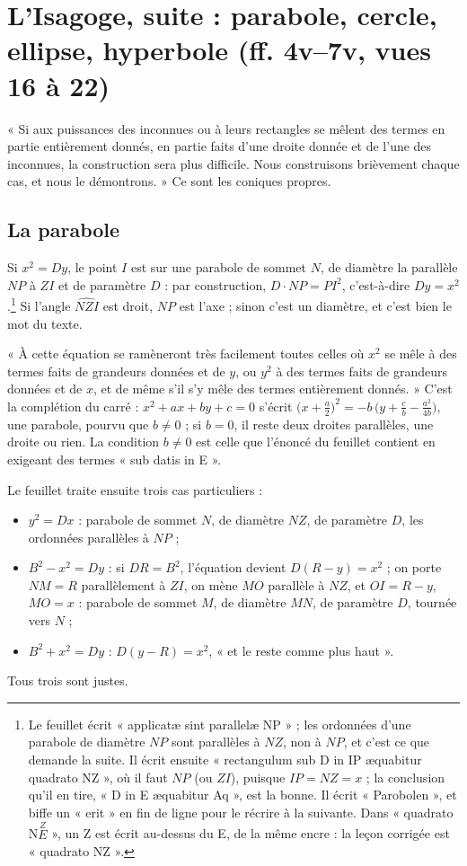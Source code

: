 \documentclass[11pt,a4paper]{article}
\begin{document}
\section*{L'Isagoge, suite : parabole, cercle, ellipse, hyperbole (ff. 4v–7v, vues 16 à 22)}

« Si aux puissances des inconnues ou à leurs rectangles se mêlent des termes
en partie entièrement donnés, en partie faits d'une droite donnée et de l'une
des inconnues, la construction sera plus difficile. Nous construisons
brièvement chaque cas, et nous le démontrons. » Ce sont les coniques propres.

\subsection*{La parabole}

Si $x^2 = Dy$, le point $I$ est sur une parabole de sommet $N$, de diamètre la
parallèle $NP$ à $ZI$ et de paramètre $D$ : par construction,
$D\cdot NP = PI^2$, c'est-à-dire $Dy = x^2$.\footnote{Le feuillet écrit
« applicatæ sint parallelæ NP » ; les ordonnées d'une parabole de diamètre $NP$
sont parallèles à $NZ$, non à $NP$, et c'est ce que demande la suite. Il écrit
ensuite « rectangulum sub D in IP æquabitur quadrato NZ », où il faut $NP$ (ou
$ZI$), puisque $IP = NZ = x$ ; la conclusion qu'il en tire, « D in E æquabitur
Aq », est la bonne. Il écrit « Parobolen », et biffe un « erit » en fin de
ligne pour le récrire à la suivante. Dans « quadrato N$\overset{Z}{E}$ », un Z
est écrit au-dessus du E, de la même encre : la leçon corrigée est « quadrato
NZ ».} Si l'angle $\widehat{NZI}$ est droit, $NP$ est l'axe ; sinon c'est un
diamètre, et c'est bien le mot du texte.

« À cette équation se ramèneront très facilement toutes celles où $x^2$ se mêle
à des termes faits de grandeurs données et de $y$, ou $y^2$ à des termes faits
de grandeurs données et de $x$, et de même s'il s'y mêle des termes entièrement
donnés. » C'est la complétion du carré : $x^2 + ax + by + c = 0$ s'écrit
$\bigl(x + \tfrac a2\bigr)^2 = -b\,\bigl(y + \tfrac{c}{b} - \tfrac{a^2}{4b}\bigr)$,
une parabole, pourvu que $b \neq 0$ ; si $b = 0$, il reste deux droites
parallèles, une droite ou rien. La condition $b\neq 0$ est celle que l'énoncé
du feuillet contient en exigeant des termes « sub datis in E ».

Le feuillet traite ensuite trois cas particuliers :
\begin{itemize}
  \item $y^2 = Dx$ : parabole de sommet $N$, de diamètre $NZ$, de paramètre $D$,
    les ordonnées parallèles à $NP$ ;
  \item $B^2 - x^2 = Dy$ : si $DR = B^2$, l'équation devient
    $D(R - y) = x^2$ ; on porte $NM = R$ parallèlement à $ZI$, on mène $MO$
    parallèle à $NZ$, et $OI = R - y$, $MO = x$ : parabole de sommet $M$, de
    diamètre $MN$, de paramètre $D$, tournée vers $N$ ;
  \item $B^2 + x^2 = Dy$ : $D(y - R) = x^2$, « et le reste comme plus haut ».
\end{itemize}
Tous trois sont justes.
\end{document}
